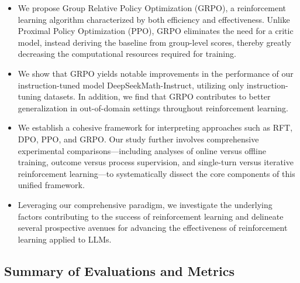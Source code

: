 \begin{itemize}[topsep=0pt]
    \item We propose Group Relative Policy Optimization (GRPO), a reinforcement learning algorithm characterized by both efficiency and effectiveness. Unlike Proximal Policy Optimization (PPO), GRPO eliminates the need for a critic model, instead deriving the baseline from group-level scores, thereby greatly decreasing the computational resources required for training.
    \item We show that GRPO yields notable improvements in the performance of our instruction-tuned model DeepSeekMath-Instruct, utilizing only instruction-tuning datasets. In addition, we find that GRPO contributes to better generalization in out-of-domain settings throughout reinforcement learning.
    \item We establish a cohesive framework for interpreting approaches such as RFT, DPO, PPO, and GRPO. Our study further involves comprehensive experimental comparisons—including analyses of online versus offline training, outcome versus process supervision, and single-turn versus iterative reinforcement learning—to systematically dissect the core components of this unified framework.
    \item Leveraging our comprehensive paradigm, we investigate the underlying factors contributing to the success of reinforcement learning and delineate several prospective avenues for advancing the effectiveness of reinforcement learning applied to LLMs.
\end{itemize}

\subsection{Summary of Evaluations and Metrics}

